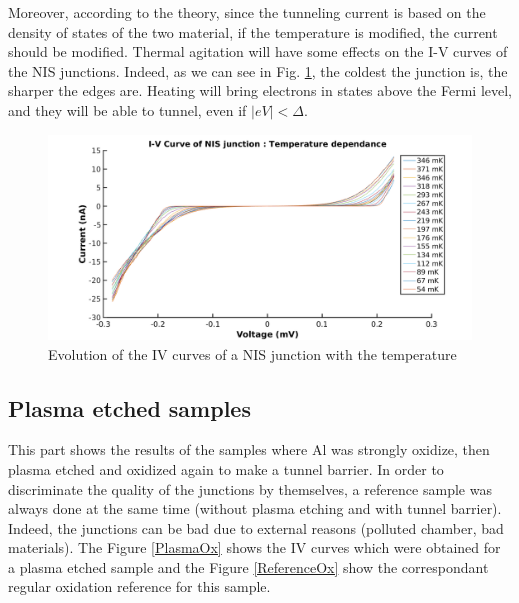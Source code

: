                 Moreover, according to the theory, since the tunneling current is based on the density of states of the two material, if the temperature is modified, the current should be modified. Thermal agitation will have some effects on the I-V curves of the NIS junctions. Indeed, as we can see in Fig. \ref{Tsweep}, the coldest the junction is, the sharper the edges are. Heating will bring electrons in states above the Fermi level, and they will be able to tunnel, even if $|eV|<\Delta$.
                
                \begin{figure}
                    \centering
                    \includegraphics[width=15cm]{Tsweep.png}
                    \caption{Evolution of the IV curves of a NIS junction with the temperature}
                    \label{Tsweep}
                \end{figure}
                
                      
                \subsection{Plasma etched samples}
                This part shows the results of the samples where Al was strongly oxidize, then plasma etched and oxidized again to make a tunnel barrier. In order to discriminate the quality of the junctions by themselves, a reference sample was always done at the same time (without plasma etching and with tunnel barrier). Indeed, the junctions can be bad due to external reasons (polluted chamber, bad materials).
                The Figure \ref{PlasmaOx} shows the IV curves which were obtained for a plasma etched sample and the Figure \ref{ReferenceOx} show the correspondant regular oxidation reference for this sample.
         
